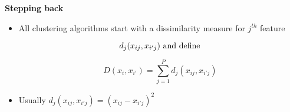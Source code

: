 \documentclass[letterpaper]{seminar}
\begin{document}
\begin{slide}

{\bf Stepping back}

\begin{itemize}

\item All clustering algorithms start with a dissimilarity measure for $j^{th}$ feature

$$d_j (x_{ij} , x_{i' j}) \ \rm and\ define $$

$$D (x_i, x_{i'}) = \sum^P_{j=1} d_j (x_{ij}, x_{{i'}j} ) $$

\item[] Usually $d_j (x_{ij}, x_{i' j}) = (x_{ij} - x_{i'j})^2$

\end{itemize}

\newpage
\end{slide}
\end{document}
